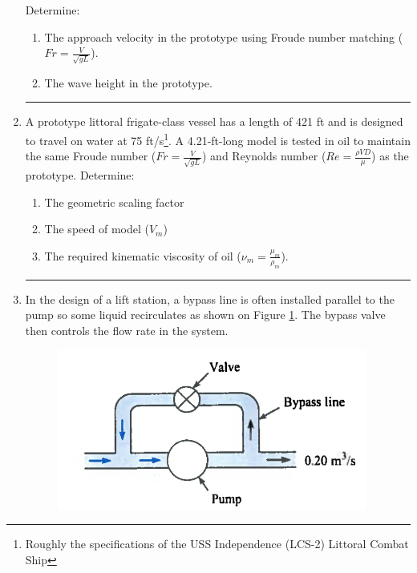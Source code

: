 \documentclass[12pt]{article}
\begin{document}
\begin{enumerate}
Determine:
\begin{enumerate}
\item The approach velocity in the prototype using Froude number matching ($Fr = \frac{V}{\sqrt{gL}}$).
\item The wave height in the prototype.
\end{enumerate}
\noindent\rule{\linewidth}{0.4pt}
\clearpage
\item A prototype littoral frigate-class vessel has a length of 421 ft and is designed to travel on water at 75 ft/s\footnote{Roughly the specifications of the USS Independence (LCS-2) Littoral Combat Ship}. A 4.21-ft-long model is tested in oil to maintain the same Froude number ($Fr = \frac{V}{\sqrt{gL}}$) and Reynolds number ($Re = \frac{\rho V D}{\mu}$) as the prototype. Determine:
\begin{enumerate}
\item The geometric scaling factor
\item The speed of model ($V_m$) 
\item The required kinematic viscosity of oil ($\nu_m = \frac{\mu_m}{\rho_m}$). 
\end{enumerate}

\noindent\rule{\linewidth}{0.4pt}
\clearpage
\item In the design of a lift station, a bypass line is often installed parallel to the pump so some liquid recirculates as shown on Figure \ref{fig:pump-bypass}. The bypass valve then controls the flow rate in the system.

\begin{figure}[h!] %
   \centering
   \includegraphics[width=4in]{pump-bypass.png} 
   \caption{}
   \label{fig:pump-bypass}
\end{figure}


\end{enumerate}
\end{document}
